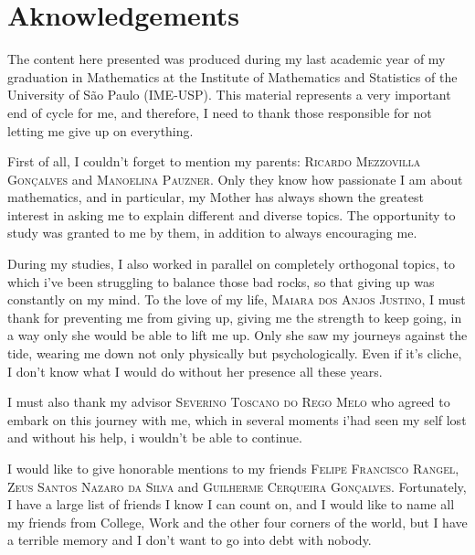 \chapter*{Aknowledgements}

The content here presented was produced during my last academic year of my graduation in Mathematics at the Institute of Mathematics and Statistics of the University of São Paulo (IME-USP). This material represents a very important end of cycle for me, and therefore, I need to thank those responsible for not letting me give up on everything.

First of all, I couldn't forget to mention my parents: \textsc{Ricardo Mezzovilla Gonçalves} and \textsc{Manoelina Pauzner}. Only they know how passionate I am about mathematics, and in particular, my Mother has always shown the greatest interest in asking me to explain different and diverse topics. The opportunity to study was granted to me by them, in addition to always encouraging me.

During my studies, I also worked in parallel on completely orthogonal topics, to which i've been struggling to balance those bad rocks, so that giving up was constantly on my mind. To the love of my life, \textsc{Maiara dos Anjos Justino}, I must thank for preventing me from giving up, giving me the strength to keep going, in a way only she would be able to lift me up. Only she saw my journeys against the tide, wearing me down not only physically but psychologically. Even if it's cliche, I don't know what I would do without her presence all these years.

I must also thank my advisor \textsc{Severino Toscano do Rego Melo} who agreed to embark on this journey with me, which in several moments i'had seen my self lost and without his help, i wouldn't be able to continue.

I would like to give honorable mentions to my friends \textsc{Felipe Francisco Rangel}, \textsc{Zeus Santos Nazaro da Silva} and \textsc{Guilherme Cerqueira Gonçalves}. Fortunately, I have a large list of friends I know I can count on, and I would like to name all my friends from College, Work and the other four corners of the world, but I have a terrible memory and I don't want to go into debt with nobody.